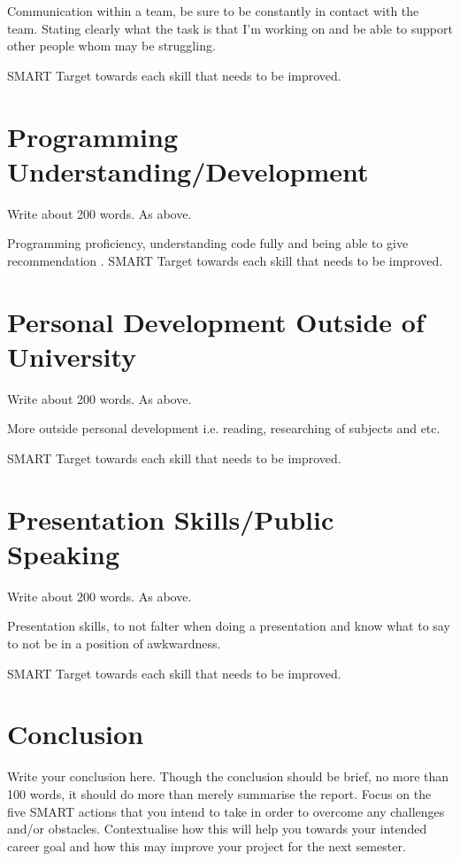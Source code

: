 \documentclass{scrartcl}
\begin{document}
Communication within a team, be sure to be constantly in contact with the team. Stating clearly what the task is that I'm working on and be able to support other people whom may be struggling.  

SMART Target towards each skill that needs to be improved.

\section{Programming Understanding/Development}

Write about 200 words. As above.

Programming proficiency, understanding code fully and being able to give recommendation .
SMART Target towards each skill that needs to be improved.

\section{Personal Development Outside of University}

Write about 200 words. As above.

More outside personal development i.e. reading, researching of subjects and etc.

SMART Target towards each skill that needs to be improved.


\section{Presentation Skills/Public Speaking}

Write about 200 words. As above.

Presentation skills, to not falter when doing a presentation and know what to say to not be in a position of awkwardness. 

SMART Target towards each skill that needs to be improved.

\section{Conclusion}

Write your conclusion here. Though the conclusion should be brief, no more than 100 words, it should do more than merely summarise the report. Focus on the five SMART actions that you intend to take in order to overcome any challenges and/or obstacles. Contextualise how this will help you towards your intended career goal and how this may improve your project for the next semester.



\end{document}
